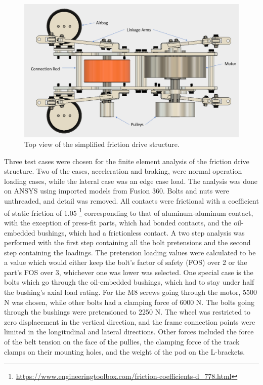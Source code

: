 \documentclass[main.tex]{subfiles}
\begin{document}
\begin{figure}[H]
\includegraphics[width=\textwidth]{images/OrthoTopLabelled.png}
\caption{Top view of the simplified friction drive structure.}\label{fig:otl}
\end{figure}

Three test cases were chosen for the finite element analysis of the friction drive structure. Two of the cases, acceleration and braking, were normal operation loading cases, while the lateral case was an edge case load. The analysis was done on ANSYS using imported models from Fusion 360. Bolts and nuts were unthreaded, and detail was removed. All contacts were frictional with a coefficient of static friction of 1.05 \footnote{\url{https://www.engineeringtoolbox.com/friction-coefficients-d_778.html}} corresponding to that of aluminum-aluminum contact, with the exception of press-fit parts, which had bonded contacts, and the oil-embedded bushings, which had a frictionless contact. A two step analysis was performed with the first step containing all the bolt pretensions and the second step containing the loadings. The pretension loading values were calculated to be a value which would either keep the bolt's factor of safety (FOS) over 2 or the part's FOS over 3, whichever one was lower was selected. One special case is the bolts which go through the oil-embedded bushings, which had to stay under half the bushing's axial load rating. For the M8 screws going through the motor, 5500 N was chosen, while other bolts had a clamping force of 6000 N. The bolts going through the bushings were pretensioned to 2250 N. The wheel was restricted to zero displacement in the vertical direction, and the frame connection points were limited in the longitudinal and lateral directions. Other forces included the force of the belt tension on the face of the pullies, the clamping force of the track clamps on their mounting holes, and the weight of the pod on the L-brackets.\\
\end{document}
